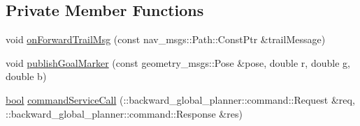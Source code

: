 \subsection*{Private Member Functions}
\begin{DoxyCompactItemize}
\item 
void \hyperlink{classmove__base__z__client_1_1backward__global__planner_1_1BackwardGlobalPlanner_a21ba5e6dbe063eb3ea1a34d8cccf90a3}{on\+Forward\+Trail\+Msg} (const nav\+\_\+msgs\+::\+Path\+::\+Const\+Ptr \&trail\+Message)
\item 
void \hyperlink{classmove__base__z__client_1_1backward__global__planner_1_1BackwardGlobalPlanner_adefb1127aa2a4f9c487763aea3817864}{publish\+Goal\+Marker} (const geometry\+\_\+msgs\+::\+Pose \&pose, double r, double g, double b)
\item 
\hyperlink{classbool}{bool} \hyperlink{classmove__base__z__client_1_1backward__global__planner_1_1BackwardGlobalPlanner_a089a3f34a80d7c6540bdf771eaf409f5}{command\+Service\+Call} (\+::backward\+\_\+global\+\_\+planner\+::command\+::\+Request \&req, \+::backward\+\_\+global\+\_\+planner\+::command\+::\+Response \&res)
\end{DoxyCompactItemize}
